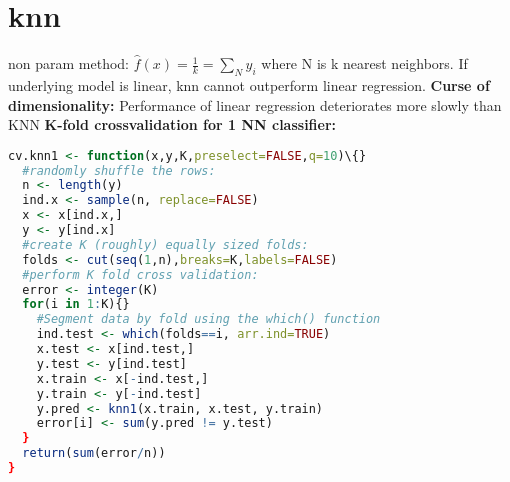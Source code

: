 \section{knn}
non param method: $\hat f(x) = \frac{1}{k} = \sum_N y_i$ where N is k nearest neighbors. If underlying model is linear, knn cannot outperform linear regression.
\textbf{Curse of dimensionality: } Performance of linear regression deteriorates more slowly than KNN
\textbf{K-fold crossvalidation for 1 NN classifier:} \begin{lstlisting}[language = R] cv.knn1 <- function(x,y,K,preselect=FALSE,q=10)\{}
  #randomly shuffle the rows:
  n <- length(y)
  ind.x <- sample(n, replace=FALSE)
  x <- x[ind.x,]
  y <- y[ind.x]
  #create K (roughly) equally sized folds:
  folds <- cut(seq(1,n),breaks=K,labels=FALSE)
  #perform K fold cross validation:
  error <- integer(K)
  for(i in 1:K){}
    #Segment data by fold using the which() function
    ind.test <- which(folds==i, arr.ind=TRUE)
    x.test <- x[ind.test,]
    y.test <- y[ind.test]
    x.train <- x[-ind.test,]
    y.train <- y[-ind.test]
    y.pred <- knn1(x.train, x.test, y.train)
    error[i] <- sum(y.pred != y.test)
  }
  return(sum(error/n))
} \end{lstlisting}
